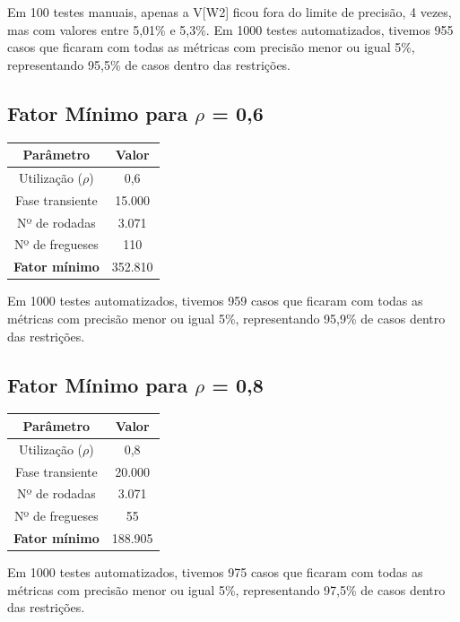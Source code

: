 \documentclass[a4paper,12pt]{report}
\begin{document}
Em 100 testes manuais, apenas a V[W2] ficou fora do limite de precisão, 4 vezes, mas com valores entre 5,01\% e 5,3\%. Em 1000 testes automatizados, tivemos 955 casos que ficaram com todas as métricas com precisão menor ou igual 5\%, representando 95,5\% de casos dentro das restrições.


\subsection{Fator Mínimo para $\rho$ = 0,6}
\begin{center}
\begin{tabular}{ c c }
  \hline
  \textbf{Parâmetro} & \textbf{Valor}\\
  \hline
  Utilização ($\rho$) & 0,6\\
  Fase transiente & 15.000\\
  Nº de rodadas & 3.071\\
  Nº de fregueses & 110\\
  \hline
  \textbf{Fator mínimo} & 352.810\\
  \hline
\end{tabular}
\end{center}

Em 1000 testes automatizados, tivemos 959 casos que ficaram com todas as métricas com precisão menor ou igual 5\%, representando 95,9\% de casos dentro das restrições.

\subsection{Fator Mínimo para $\rho$ = 0,8}
\begin{center}
\begin{tabular}{ c c }
  \hline
  \textbf{Parâmetro} & \textbf{Valor}\\
  \hline
  Utilização ($\rho$) & 0,8\\
  Fase transiente & 20.000\\
  Nº de rodadas & 3.071\\
  Nº de fregueses & 55\\
  \hline
  \textbf{Fator mínimo} & 188.905\\
  \hline
\end{tabular}
\end{center}

Em 1000 testes automatizados, tivemos 975 casos que ficaram com todas as métricas com precisão menor ou igual 5\%, representando 97,5\% de casos dentro das restrições.
\end{document}
